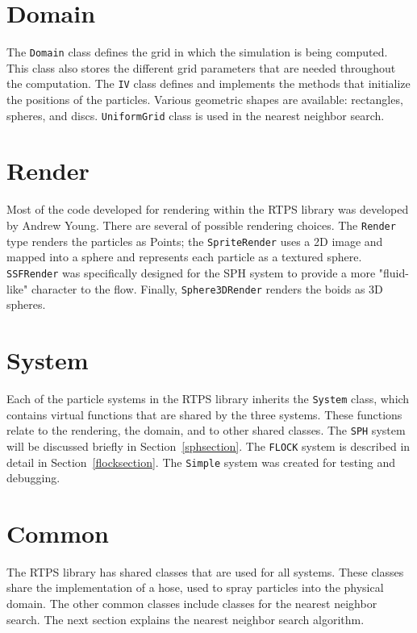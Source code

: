 \section{Domain}
The \texttt{Domain} class defines the grid in which the simulation is 
being computed. This class also stores the different grid parameters 
that are needed throughout the computation.  
The \texttt{IV} class defines and implements the methods that 
initialize the positions of the particles. 
Various geometric shapes are available: rectangles, spheres, and discs. 
\texttt{UniformGrid} class is used in the nearest neighbor search.

\section{Render}
Most of the code developed for rendering within the RTPS library was 
developed by Andrew Young\cite{andrewBlog}. There are several 
of possible rendering choices.   
The \texttt{Render} type renders the particles as Points; the 
\texttt{SpriteRender} uses a 2D image and mapped into a sphere and represents
each particle as a textured sphere. 
\texttt{SSFRender} was specifically designed for the SPH system to 
provide a more "fluid-like" character to the flow. Finally,
\texttt{Sphere3DRender} renders the boids as 3D spheres.  

\section{System}
Each of the particle systems in the RTPS library inherits the \texttt{System} 
class, which contains virtual functions that are shared by the three systems. 
These functions relate to the rendering,  the domain, and to other shared 
classes. 
The \texttt{SPH} system will be discussed briefly  in Section~\ref{sphsection}. The \texttt{FLOCK} system is described in detail in Section~\ref{flocksection}. The \texttt{Simple} system was created for testing and debugging. 

\section{Common}\label{commonsection}
The RTPS library has shared classes that are used for all systems. These classes share the implementation of a hose,  used to spray 
particles into the physical domain.  The other common classes 
include classes for the nearest neighbor search. 
The next section explains the nearest neighbor search algorithm.

